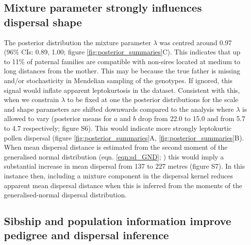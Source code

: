\documentclass[10pt, a4paper, twocolumn]{article} %
\begin{document}
\subsection{Mixture parameter strongly influences dispersal shape}

The posterior distribution the mixture parameter $\lambda$ was centred around 0.97 (96\% CIs: 0.89, 1.00; figure \ref{fig:posterior_summaries}C).
This indicates that up to 11\% of paternal families are compatible with non-sires located at medium to long distances from the mother.
This may be because the true father is missing and/or stochasticity in Mendelian sampling of the genotypes.
If ignored, this signal would inflate apparent leptokurtosis in the dataset.
Consistent with this, when we constrain $\lambda$ to be fixed at one the posterior distributions for the scale and shape parameters are shifted downwards compared to the analysis where $\lambda$ is allowed to vary (posterior means for $a$ and $b$ drop from 22.0 to 15.0 and from 5.7 to 4.7 respectively; figure S6).
This would indicate more strongly leptokurtic pollen dispersal (figure \ref{fig:posterior_summaries}A, \ref{fig:posterior_summaries}B).
When mean dispersal distance is estimated from the second moment of the generalised normal distribution (eqn. \ref{eqn:sd_GND}; \cite{clark1998trees}) this would imply a substantial increase in mean dispersal from 137 to 227 metres (figure S7).
In this instance then, including a mixture component in the dispersal kernel reduces apparent mean dispersal distance when this is inferred from the moments of the generalised-normal dispersal distribution.

\subsection{Sibship and population information improve pedigree and dispersal inference}
\end{document}
